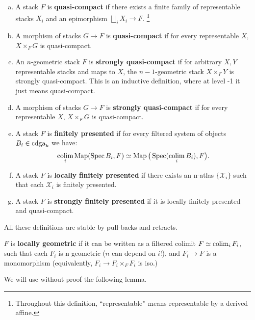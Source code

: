 \begin{defin}
\hfill
\begin{enumerate}[(a)]
\item A stack $F$ is \textbf{quasi-compact} if there exists a finite family of representable stacks $X_i$ and an
epimorphism $\bigsqcup_i X_i \to F$.
\footnote{Throughout this definition, ``representable'' means representable by a derived affine.}
\item A morphism of stacks $G \to F$ is \textbf{quasi-compact} if for every representable $X$, $X \times_F G$ is quasi-compact.
\item An $n$-geometric stack $F$ is \textbf{strongly quasi-compact} if for arbitrary $X, Y$ representable stacks and 
maps to $X$, the $n-1$-geometric
stack $X \times_F Y$ is strongly quasi-compact. This is an inductive definition, where at level -1 it just means quasi-compact.
\item A morphism of stacks $G \to F$ is \textbf{strongly quasi-compact} if for every representable $X$, $X \times_F G$ is quasi-compact.
\item A stack $F$ is \textbf{finitely presented} if for every filtered system of objects
$B_i \in \operatorname{cdga}_k$ we have:
\[	\operatorname*{colim}_i \operatorname{Map}(\operatorname{Spec} B_i, F) \simeq \operatorname{Map}\big(\operatorname{Spec}(\operatorname*{colim}_i B_i), F\big).	\]
\item A stack $F$ is \textbf{locally finitely presented} if there exists an n-atlas $\{\mathcal{X}_i\}$ such that each 
$\mathcal{X}_i$ is finitely presented.
\item A stack $F$ is \textbf{strongly finitely presented} if it is locally finitely presented and quasi-compact.
\end{enumerate}
\end{defin}

\begin{rem}
All these definitions are stable by pull-backs and retracts.
\end{rem}

\begin{defin}
\label{defin:locally_geometric}
$F$ is \textbf{locally geometric} if it can be written as a filtered colimit $F \simeq \operatorname*{colim}_i F_i$, such that each $F_i$
is n-geometric ($n$ can depend on $i$!), and $F_i \to F$ is a monomorphism (equivalently, $F_i \to F_i \times_F F_i$ is iso.)
\end{defin}

We will use without proof the following lemma.

